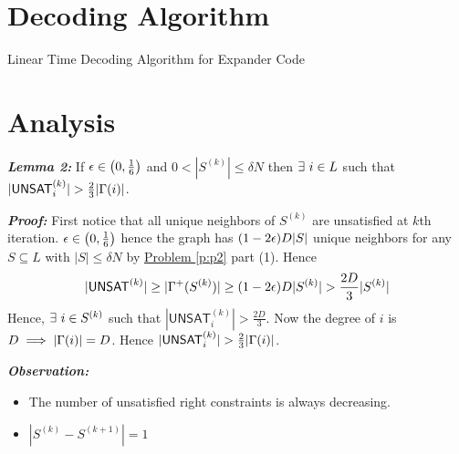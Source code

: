 \documentclass[a4paper, 11pt]{article}
\begin{document}
{\begin{enumerate}
\section{Decoding Algorithm}
	\begin{algorithm}
		\caption{Linear Time Decoding Algorithm for Expander Code}
		\DontPrintSemicolon
	\end{algorithm}
	
\section{Analysis}
\parinf	
\textbf{\textit{Lemma 2:}} \label{exdecodelem1}
	If $\epsilon\in\left( 0,\frac16\right)$ and $0<|S^{(k)}|\leq \delta N$ then $\exists\ i\in L$ such that $|\mathsf{UNSAT}_i^{(k)}|>\frac23|\Gm(i)|$.


\textbf{\textit{Proof:}} \parinn First notice that all unique neighbors of $S^{(k)}$ are unsatisfied at $k$th iteration. $\epsilon\in \left(0,\frac16\right)$ hence  the graph has $(1-2\epsilon)D|S|$ unique neighbors for any $S\subseteq L$ with $|S|\leq \delta N$ by \hyperref[p:p2]{Problem \ref{p:p2}} part (1). Hence $$|\mathsf{UNSAT}^{(k)}|\geq |\Gm^+(S^{(k)})|\geq (1-2\eps)D|S^{(k)}|> \frac{2D}{3}|S^{(k)}|$$Hence, $\exists\ i\in S^{(k)}$ such that $|\mathsf{UNSAT}_i^{(k)}|>\frac{2D}3$. Now the degree of $i$ is $D\implies |\Gamma(i)|=D$. Hence $|\mathsf{UNSAT}_i^{(k)}|>\frac23|\Gm(i)|$. \Qed

	
\parinf

\textbf{\textit{Observation:}} \begin{itemize}
	\item The number of unsatisfied right constraints is always decreasing.
	\item $|S^{(k)}-S^{(k+1)}|=1$
\end{itemize}


\end{enumerate}}
\end{document}

